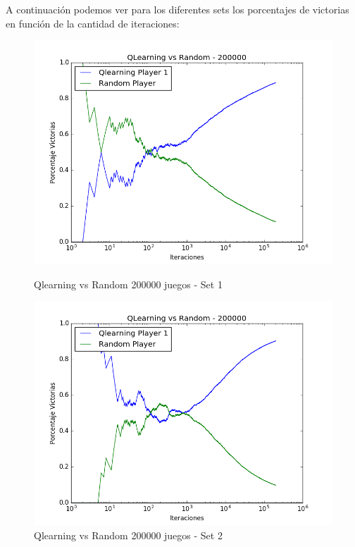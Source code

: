 A continuación podemos ver para los diferentes sets los porcentajes de victorias en función de la cantidad de iteraciones:

\begin{figure}[h]
 \centering
 \begin{minipage}{.45\textwidth}
	\centering
	\includegraphics[scale=0.35]{img1/QlearningVsRandom_200000_6x5_hernan.png}
        \caption{Qlearning vs Random 200000 juegos - Set 1}
  \end{minipage}
 \begin{minipage}{.5\textwidth}
	\centering
	\includegraphics[scale=0.35]{img1/QlearningVsRandom_200000_6x5_cyntia.png}
        \caption{Qlearning vs Random 200000 juegos - Set 2}
  \end{minipage}
\end{figure}


